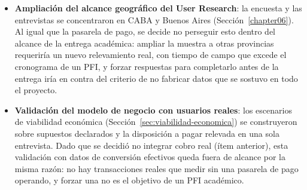 \begin{itemize}
	\item \textbf{Ampliación del alcance geográfico del User Research}: la encuesta y las entrevistas se concentraron en CABA y Buenos Aires (Sección~\ref{chapter06}). Al igual que la pasarela de pago, se decide no perseguir esto dentro del alcance de la entrega académica: ampliar la muestra a otras provincias requeriría un nuevo relevamiento real, con tiempo de campo que excede el cronograma de un PFI, y forzar respuestas para completarlo antes de la entrega iría en contra del criterio de no fabricar datos que se sostuvo en todo el proyecto.
	\item \textbf{Validación del modelo de negocio con usuarios reales}: los escenarios de viabilidad económica (Sección~\ref{sec:viabilidad-economica}) se construyeron sobre supuestos declarados y la disposición a pagar relevada en una sola entrevista. Dado que se decidió no integrar cobro real (ítem anterior), esta validación con datos de conversión efectivos queda fuera de alcance por la misma razón: no hay transacciones reales que medir sin una pasarela de pago operando, y forzar una no es el objetivo de un PFI académico.
\end{itemize}
